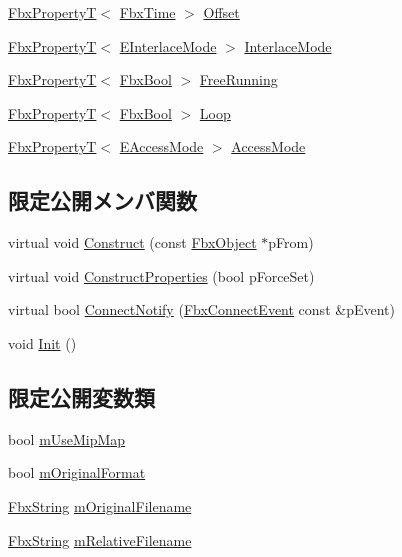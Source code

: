 \begin{DoxyCompactItemize}
\item 
\hyperlink{class_fbx_property_t}{Fbx\+PropertyT}$<$ \hyperlink{class_fbx_time}{Fbx\+Time} $>$ \hyperlink{class_fbx_video_ac21a47d9f4ec91abf585b2bcf8e0a3aa}{Offset}
\item 
\hyperlink{class_fbx_property_t}{Fbx\+PropertyT}$<$ \hyperlink{class_fbx_video_a1e60229c28a15e29289f3f00b23aa215}{E\+Interlace\+Mode} $>$ \hyperlink{class_fbx_video_a624969738a09268e8897cffbe94e5188}{Interlace\+Mode}
\item 
\hyperlink{class_fbx_property_t}{Fbx\+PropertyT}$<$ \hyperlink{fbxtypes_8h_a92e0562b2fe33e76a242f498b362262e}{Fbx\+Bool} $>$ \hyperlink{class_fbx_video_abb47ae8cd752b8846cda1ad1d7e1ffff}{Free\+Running}
\item 
\hyperlink{class_fbx_property_t}{Fbx\+PropertyT}$<$ \hyperlink{fbxtypes_8h_a92e0562b2fe33e76a242f498b362262e}{Fbx\+Bool} $>$ \hyperlink{class_fbx_video_aa325b2e04fac1593125ca02e6dc6a423}{Loop}
\item 
\hyperlink{class_fbx_property_t}{Fbx\+PropertyT}$<$ \hyperlink{class_fbx_video_a6dd88dabb2170adcd8c58952ed2e0c40}{E\+Access\+Mode} $>$ \hyperlink{class_fbx_video_a23a5a08b0504da545d812c16a7a0d20a}{Access\+Mode}
\end{DoxyCompactItemize}
\subsection*{限定公開メンバ関数}
\begin{DoxyCompactItemize}
\item 
virtual void \hyperlink{class_fbx_video_a1cd66b3d19e213f62f90d073462e4cce}{Construct} (const \hyperlink{class_fbx_object}{Fbx\+Object} $\ast$p\+From)
\item 
virtual void \hyperlink{class_fbx_video_a25c6015f2330ec4ff029ac919b1a231c}{Construct\+Properties} (bool p\+Force\+Set)
\item 
virtual bool \hyperlink{class_fbx_video_afb1d8565917f33ab3777ac9e07b21cd0}{Connect\+Notify} (\hyperlink{class_fbx_connect_event}{Fbx\+Connect\+Event} const \&p\+Event)
\item 
void \hyperlink{class_fbx_video_a7eebf649a1500d85b39a69673ef75a9c}{Init} ()
\end{DoxyCompactItemize}
\subsection*{限定公開変数類}
\begin{DoxyCompactItemize}
\item 
bool \hyperlink{class_fbx_video_a2c100f8b0f670f8490d91c71ac6b539e}{m\+Use\+Mip\+Map}
\item 
bool \hyperlink{class_fbx_video_a8e767da7513901cbc25a298e18a2b616}{m\+Original\+Format}
\item 
\hyperlink{class_fbx_string}{Fbx\+String} \hyperlink{class_fbx_video_ad87f8963e4e7a262c8470be9cbcfb723}{m\+Original\+Filename}
\item 
\hyperlink{class_fbx_string}{Fbx\+String} \hyperlink{class_fbx_video_a3645c6b2f2e12d12f544100cf0c9033a}{m\+Relative\+Filename}
\end{DoxyCompactItemize}
